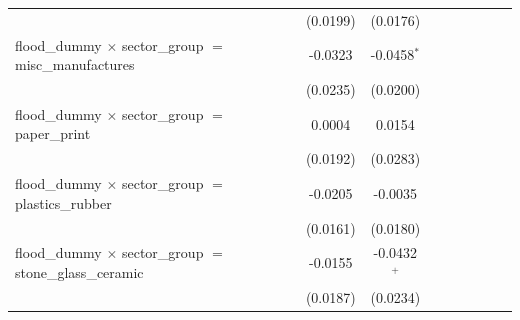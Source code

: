 \begin{tabular}{lcccccccc}
                                                                                  & (0.0199)              & (0.0176)              &                       &                       &                       &                       &                       &   \\   
   flood\_dummy $\times$ sector\_group $=$ misc\_manufactures                     & -0.0323               & -0.0458$^{*}$         &                       &                       &                       &                       &                       &   \\   
                                                                                  & (0.0235)              & (0.0200)              &                       &                       &                       &                       &                       &   \\   
   flood\_dummy $\times$ sector\_group $=$ paper\_print                           & 0.0004                & 0.0154                &                       &                       &                       &                       &                       &   \\   
                                                                                  & (0.0192)              & (0.0283)              &                       &                       &                       &                       &                       &   \\   
   flood\_dummy $\times$ sector\_group $=$ plastics\_rubber                       & -0.0205               & -0.0035               &                       &                       &                       &                       &                       &   \\   
                                                                                  & (0.0161)              & (0.0180)              &                       &                       &                       &                       &                       &   \\   
   flood\_dummy $\times$ sector\_group $=$ stone\_glass\_ceramic                  & -0.0155               & -0.0432$^{+}$         &                       &                       &                       &                       &                       &   \\   
                                                                                  & (0.0187)              & (0.0234)              &                       &                       &                       &                       &                       &   \\   

\end{tabular}
